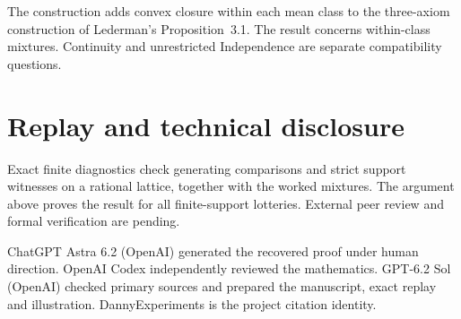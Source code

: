\documentclass[11pt,a4paper]{amsart}
\begin{document}
The construction adds convex closure within each mean class to the three-axiom construction of Lederman's Proposition~3.1. The result concerns within-class mixtures. Continuity and unrestricted Independence are separate compatibility questions.

\section*{Replay and technical disclosure}
Exact finite diagnostics check generating comparisons and strict support witnesses on a rational lattice, together with the worked mixtures. The argument above proves the result for all finite-support lotteries. External peer review and formal verification are pending.

ChatGPT Astra 6.2 (OpenAI) generated the recovered proof under human direction. OpenAI Codex independently reviewed the mathematics. GPT-6.2 Sol (OpenAI) checked primary sources and prepared the manuscript, exact replay and illustration. DannyExperiments is the project citation identity.



\end{document}
